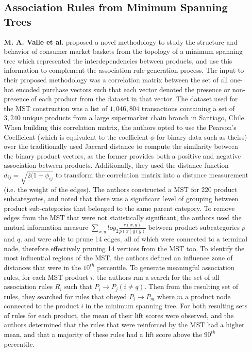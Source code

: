 \documentclass[paper=a4,fontsize=11pt]{report}	%
\begin{document}
\subsection{Association Rules from Minimum Spanning Trees}
\label{sec:mst paper}
\textbf{M. A. Valle et al.} \cite{mst_paper} proposed a novel methodology to study the structure and behavior of consumer market baskets from the topology of a minimum spanning tree which represented the interdependencies between products, and use this information to complement the association rule generation process. The input to their proposed methodology was a correlation matrix between the set of all one-hot encoded purchase vectors such that each vector denoted the presence or non-presence of each product from the dataset in that vector.  The dataset used for the MST construction was a list of $1,046,804$ transactions containing a set of $3,240$ unique products from a large supermarket chain branch in Santiago, Chile.  When building this correlation matrix, the authors opted to use the Pearson's Coefficient (which is equivalent to the coefficient $\phi$ for binary data such as theirs) over the traditionally used Jaccard distance to compute the similarity between the binary product vectors, as the former provides both a positive and negative association between products. Additionally,  they used the distance function $d_{ij} = \sqrt{2(1-\phi_{ij}}$ to transform the correlation matrix into a distance measurement (i.e. the weight of the edges).  The authors constructed a MST for 220 product subcategories, and noted that there was a significant level of grouping between product sub-categories that belonged to the same parent category.  To remove edges from the MST that were not statistically significant,  the authors used the mutual information \cite{measure} measure $\sum\limits_{x,y}log_2 \frac{r(x,y)}{p(x)q(y)}$ between product subcategories $p$ and $q$, and were able to prune 14 edges, all of which were connected to a terminal node, therefore effectively pruning 14 vertices from the MST too. To identify the most influential regions of the MST, the authors defined an influence zone of distances that were in the $10^{th}$ percentile. To generate meaningful association rules,  for each MST product $i$, the authors ran a search for the set of all association rules $R_i$ such that $P_i \rightarrow P_j (i \neq q)$. Then from the resulting set of rules, they searched for rules that obeyed $P_i \rightarrow P_m$ where $m$ a product node connected to the product $i$ in the minimum spanning tree.  For both resulting sets of rules for each product, the mean of their lift scores were observed, and the authors determined that the rules that were reinforced by the MST had a higher mean, and that a majority of these rules had a lift score above the $90^{th}$ percentile. 
\end{document}
